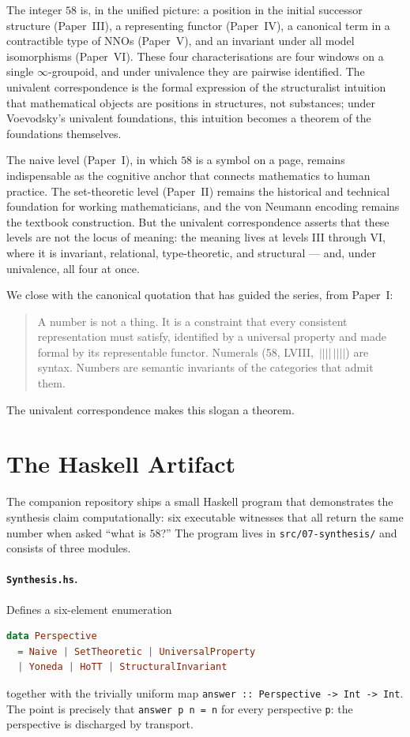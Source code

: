 \documentclass[12pt]{article}
\theoremstyle{definition}
\theoremstyle{remark}
\begin{document}
The integer $58$ is, in the unified picture: a position in the initial
successor structure (Paper~III), a representing functor (Paper~IV), a
canonical term in a contractible type of NNOs (Paper~V), and an
invariant under all model isomorphisms (Paper~VI). These four
characterisations are four windows on a single $\infty$-groupoid, and
under univalence they are pairwise identified. The univalent correspondence
is the formal expression of the structuralist intuition that mathematical
objects are positions in structures, not substances; under Voevodsky's
univalent foundations, this intuition becomes a theorem of the
foundations themselves.

The naive level (Paper~I), in which $58$ is a symbol on a page, remains
indispensable as the cognitive anchor that connects mathematics to human
practice. The set-theoretic level (Paper~II) remains the historical and
technical foundation for working mathematicians, and the von Neumann
encoding remains the textbook construction. But the univalent
correspondence asserts that these levels are not the locus of meaning:
the meaning lives at levels III through VI, where it is invariant,
relational, type-theoretic, and structural --- and, under univalence, all
four at once.

We close with the canonical quotation that has guided the series, from
Paper~I:

\begin{quote}
A number is not a thing. It is a constraint that every consistent
representation must satisfy, identified by a universal property and made
formal by its representable functor. Numerals (58, \textsf{LVIII},
$\,||||\,||||$) are syntax. Numbers are semantic invariants of the
categories that admit them.
\end{quote}

\noindent The univalent correspondence makes this slogan a theorem.

\section{The Haskell Artifact}
\label{sec:haskell}

The companion repository ships a small Haskell program that demonstrates
the synthesis claim computationally: six executable witnesses that all
return the same number when asked ``what is $58$?'' The program lives in
\verb|src/07-synthesis/| and consists of three modules.

\paragraph{\normalfont\texttt{Synthesis.hs}.} Defines a six-element
enumeration
\begin{lstlisting}[language=Haskell]
data Perspective
  = Naive | SetTheoretic | UniversalProperty
  | Yoneda | HoTT | StructuralInvariant
\end{lstlisting}
together with the trivially uniform map
\verb|answer :: Perspective -> Int -> Int|. The point is precisely that
\verb|answer p n = n| for every perspective \verb|p|: the perspective is
discharged by transport.
\end{document}

